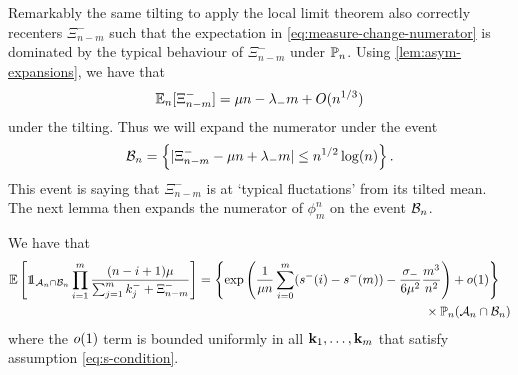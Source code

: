 Remarkably the same tilting to apply the local limit theorem also correctly recenters $\Xi_{n-m}^-$ such that the expectation in \cref{eq:measure-change-numerator} is dominated by the typical behaviour of $\Xi_{n-m}^-$ under $\P_n$. Using \cref{lem:asym-expansions}, we have that
\begin{equation*}
    \E_n[\Xi_{n-m}^-] =  \mu n - \lambda_- m + \bigo(n^{1/3})
\end{equation*}
under the tilting. Thus we will expand the numerator under the event
\begin{equation*}
    \omegaEvent_n = \left\{ 
        \abs{\Xi^-_{n-m} - \mu n + \lambda_- m} \leq n^{1/2} \log(n)
     \right\}.
\end{equation*}
This event is saying that $\Xi_{n-m}^-$ is at `typical fluctations' from its tilted mean. The next lemma then expands the numerator of $\phi^n_m$ on the event $\omegaEvent_n$.
\begin{lemma}
    \label{lem:measure-change-numerator}
    We have that
    \begin{align*}
        \E\left[ 
            \one_{\lltEvent_n \cap \omegaEvent_n}
            \prod_{i=1}^m \frac{(n - i + 1) \mu}{\sum_{j=1}^m k_j^- + \Xi_{n-m}^-}
        \right]
        & =
        \left\{ \exp\left(
            \frac{1}{\mu n} \sum_{i=0}^m (s^-(i) - s^-(m)) - \frac{\sigma_-}{6 \mu^2} \frac{m^3}{n^2}
        \right) + \littleo(1) \right\} \\
        & \hspace{18em} \times \P_n(\lltEvent_n \cap \omegaEvent_n)
    \end{align*}
    where the $\littleo(1)$ term is bounded uniformly in all $\vk_1, \ldots, \vk_m$ that satisfy assumption \cref{eq:s-condition}.
\end{lemma}
